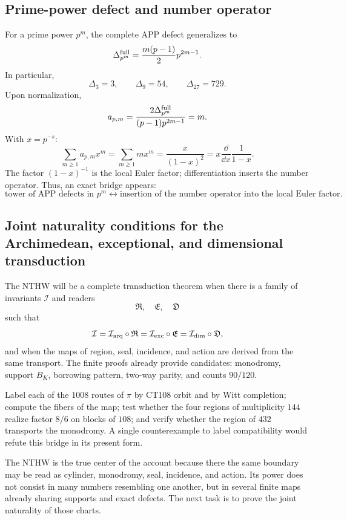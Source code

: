 \subsection{Prime-power defect and number operator}

For a prime power \(p^m\), the complete APP defect generalizes to
\[
\Delta_{p^m}^{\rm full}
=\frac{m(p-1)}2p^{2m-1}.
\]
In particular,
\[
\Delta_3=3,
\qquad
\Delta_9=54,
\qquad
\Delta_{27}=729.
\]
Upon normalization,
\[
a_{p,m}
=\frac{2\Delta_{p^m}^{\rm full}}{(p-1)p^{2m-1}}
=m.
\]
With \(x=p^{-s}\):
\[
\sum_{m\ge1}a_{p,m}x^m
=\sum_{m\ge1}mx^m
=\frac{x}{(1-x)^2}
=x\frac{\dd}{\dd x}\frac1{1-x}.
\]
The factor \((1-x)^{-1}\) is the local Euler factor; differentiation inserts the
number operator. Thus, an exact bridge appears:
\[
\boxed{
\text{tower of APP defects in }p^m
\longleftrightarrow
\text{insertion of the number operator into the local Euler factor}.}
\]

\subsection{Joint naturality conditions for the Archimedean, exceptional, and dimensional transduction}

The NTHW will be a complete transduction theorem when there is a family of
invariants \(\mathcal I\) and readers
\[
\mathfrak R,\quad\mathfrak E,\quad\mathfrak D
\]
such that
\[
\mathcal I
=\mathcal I_{\rm arq}\circ\mathfrak R
=\mathcal I_{\rm exc}\circ\mathfrak E
=\mathcal I_{\rm dim}\circ\mathfrak D,
\]
and when the maps of region, seal, incidence, and action are derived from the same
transport. The finite proofs already provide candidates: monodromy,
support \(B_K\), borrowing pattern, two-way parity, and counts \(90/120\).

\begin{programbox}[title={Executable test 108--144--90--120}]
Label each of the \(1008\) routes of \(\pi\) by CT108 orbit and by
Witt completion; compute the fibers of the map; test whether the four
regions of multiplicity \(144\) realize factor \(8/6\) on blocks
of \(108\); and verify whether the region of \(432\) transports the monodromy. A
single counterexample to label compatibility would refute this bridge in
its present form.
\end{programbox}

\begin{takeawaybox}
The NTHW is the true center of the account because there the same boundary may be read
as cylinder, monodromy, seal, incidence, and action. Its power does not consist
in many numbers resembling one another, but in several finite maps already
sharing supports and exact defects. The next task is to prove the
joint naturality of those charts.
\end{takeawaybox}


